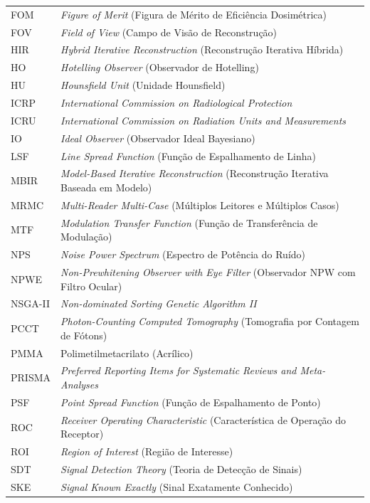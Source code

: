 \documentclass[
  12pt,
  a4paper,
  oneside
]{report}
\begin{document}
\begin{longtable}{p{}p{}}
  FOM    & \emph{Figure of Merit} (Figura de Mérito de Eficiência Dosimétrica) \\
  FOV    & \emph{Field of View} (Campo de Visão de Reconstrução) \\
  HIR    & \emph{Hybrid Iterative Reconstruction} (Reconstrução Iterativa Híbrida) \\
  HO     & \emph{Hotelling Observer} (Observador de Hotelling) \\
  HU     & \emph{Hounsfield Unit} (Unidade Hounsfield) \\
  ICRP   & \emph{International Commission on Radiological Protection} \\
  ICRU   & \emph{International Commission on Radiation Units and Measurements} \\
  IO     & \emph{Ideal Observer} (Observador Ideal Bayesiano) \\
  LSF    & \emph{Line Spread Function} (Função de Espalhamento de Linha) \\
  MBIR   & \emph{Model-Based Iterative Reconstruction} (Reconstrução Iterativa Baseada em Modelo) \\
  MRMC   & \emph{Multi-Reader Multi-Case} (Múltiplos Leitores e Múltiplos Casos) \\
  MTF    & \emph{Modulation Transfer Function} (Função de Transferência de Modulação) \\
  NPS    & \emph{Noise Power Spectrum} (Espectro de Potência do Ruído) \\
  NPWE   & \emph{Non-Prewhitening Observer with Eye Filter} (Observador NPW com Filtro Ocular) \\
  NSGA-II& \emph{Non-dominated Sorting Genetic Algorithm II} \\
  PCCT   & \emph{Photon-Counting Computed Tomography} (Tomografia por Contagem de Fótons) \\
  PMMA   & Polimetilmetacrilato (Acrílico) \\
  PRISMA & \emph{Preferred Reporting Items for Systematic Reviews and Meta-Analyses} \\
  PSF    & \emph{Point Spread Function} (Função de Espalhamento de Ponto) \\
  ROC    & \emph{Receiver Operating Characteristic} (Característica de Operação do Receptor) \\
  ROI    & \emph{Region of Interest} (Região de Interesse) \\
  SDT    & \emph{Signal Detection Theory} (Teoria de Detecção de Sinais) \\
  SKE    & \emph{Signal Known Exactly} (Sinal Exatamente Conhecido) \\

\end{longtable}
\end{document}
